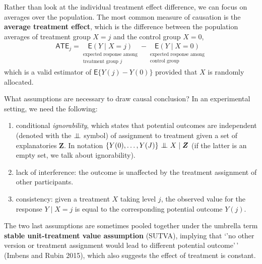 \documentclass[
  11pt,
  letterpaper,
]{scrbook}
\providecommand{\tightlist}{%
  \setlength{\itemsep}{0pt}\setlength{\parskip}{0pt}}\usepackage{longtable,booktabs,array}
\theoremstyle{definition}
\theoremstyle{definition}
\theoremstyle{remark}
\begin{document}
Rather than look at the individual treatment effect difference, we can
focus on averages over the population. The most common measure of
causation is the \textbf{average treatment effect}, which is the
difference between the population averages of treatment group \(X=j\)
and the control group \(X=0\), \begin{align*}
\textsf{ATE}_j = \underset{\substack{\text{expected response among}\\\text{treatment group $j$}}}{\mathsf{E}(Y \mid X=j)} - \underset{\substack{\text{expected response among}\\\text{control group}}}{\mathsf{E}(Y \mid X=0)}
\end{align*} which is a valid estimator of \(\mathsf{E}\{Y(j) - Y(0)\}\)
provided that \(X\) is randomly allocated.

What assumptions are necessary to draw causal conclusion? In an
experimental setting, we need the following:

\begin{enumerate}
\def\labelenumi{\arabic{enumi}.}
\tightlist
\item
  conditional \emph{ignorability}, which states that potential outcomes
  are independent (denoted with the \({\perp\mkern-10mu\perp}\) symbol)
  of assignment to treatment given a set of explanatories
  \(\boldsymbol{Z}.\) In notation
  \(\{Y(0), \ldots, Y(J)\}\ {\perp\mkern-10mu\perp}\ X \mid \boldsymbol{Z}\)
  (if the latter is an empty set, we talk about ignorability).
\item
  lack of interference: the outcome is unaffected by the treatment
  assignment of other participants.
\item
  consistency: given a treatment \(X\) taking level \(j\), the observed
  value for the response \(Y \mid X=j\) is equal to the corresponding
  potential outcome \(Y(j)\).
\end{enumerate}

The two last assumptions are sometimes pooled together under the
umbrella term \textbf{stable unit-treatment value assumption} (SUTVA),
implying that `'no other version or treatment assignment would lead to
different potential outcome'\,' (Imbens and Rubin 2015), which also
suggests the effect of treatment is constant.
\end{document}
